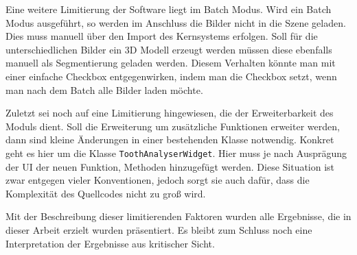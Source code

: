 Eine weitere Limitierung der Software liegt im Batch Modus. Wird ein Batch Modus
ausgeführt, so werden im Anschluss die Bilder nicht in die Szene geladen. Dies
muss manuell über den Import des Kernsystems erfolgen. Soll für die unterschiedlichen
Bilder ein \ac{3D} Modell erzeugt werden müssen diese ebenfalls manuell als
Segmentierung geladen werden. Diesem Verhalten könnte man mit einer einfache Checkbox
entgegenwirken, indem man die Checkbox setzt, wenn man nach dem Batch alle Bilder
laden möchte.

Zuletzt sei noch auf eine Limitierung hingewiesen, die der Erweiterbarkeit des
Moduls dient. Soll die Erweiterung um zusätzliche Funktionen erweiter werden,
dann sind kleine Änderungen in einer bestehenden Klasse notwendig. Konkret geht es
hier um die Klasse \texttt{ToothAnalyserWidget}. Hier muss je nach Ausprägung der
\ac{UI} der neuen Funktion, Methoden hinzugefügt werden. Diese Situation ist
zwar entgegen vieler Konventionen, jedoch sorgt sie auch dafür, dass die
Komplexität des Quellcodes nicht zu groß wird.

Mit der Beschreibung dieser limitierenden Faktoren wurden alle Ergebnisse, die in
dieser Arbeit erzielt wurden präsentiert. Es bleibt zum Schluss noch eine
Interpretation der Ergebnisse aus kritischer Sicht.
